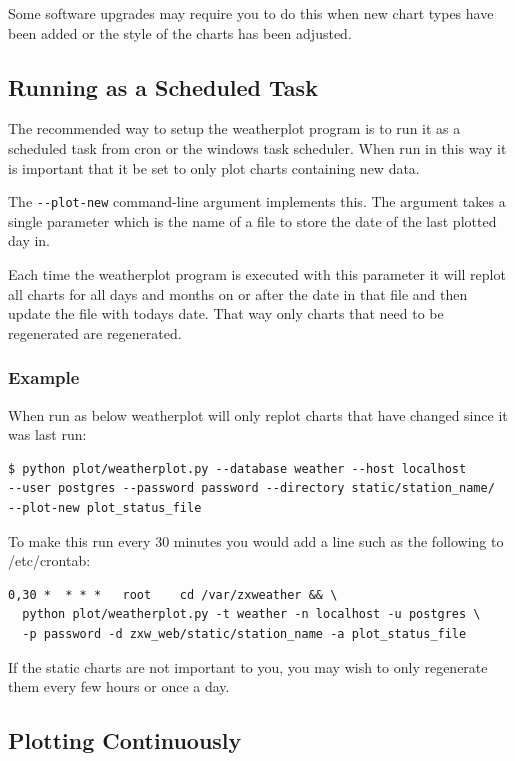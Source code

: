 \documentclass[a4paper,10pt,draft]{book}
\begin{document}
Some software upgrades may require you to do this when new chart types have been added or the style of the charts has been adjusted.

\subsection{Running as a Scheduled Task}

The recommended way to setup the weatherplot program is to run it as a scheduled task from cron or the windows task scheduler. When run in this way it is important that it be set to only plot charts containing new data.

The \verb|--plot-new| command-line argument implements this. The argument takes a single parameter which is the name of a file to store the date of the last plotted day in.

Each time the weatherplot program is executed with this parameter it will replot all charts for all days and months on or after the date in that file and then update the file with todays date. That way only charts that need to be regenerated are regenerated.

\subsubsection{Example}

When run as below weatherplot will only replot charts that have changed since it was last run:
\begin{verbatim}
$ python plot/weatherplot.py --database weather --host localhost
--user postgres --password password --directory static/station_name/
--plot-new plot_status_file
\end{verbatim}

To make this run every 30 minutes you would add a line such as the following to /etc/crontab:
\begin{verbatim}
0,30 *  * * *   root    cd /var/zxweather && \
  python plot/weatherplot.py -t weather -n localhost -u postgres \
  -p password -d zxw_web/static/station_name -a plot_status_file  
\end{verbatim}

If the static charts are not important to you, you may wish to only regenerate them every few hours or once a day.

\subsection{Plotting Continuously}
\end{document}
